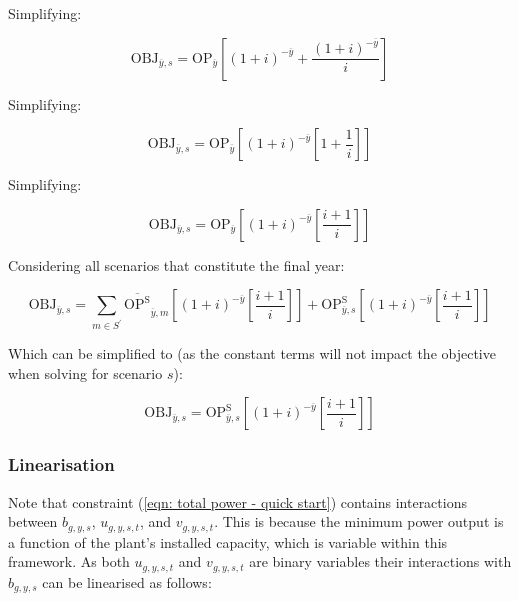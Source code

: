 \documentclass{article}
\newcommand{\sScenarios}{S}
\newcommand{\iGenerator}{g}
\newcommand{\iYear}{y}
\newcommand{\iYearTerminal}{\overline{\iYear}}
\newcommand{\iScenario}{s}
\newcommand{\iScenarioAlias}{m}
\newcommand{\iInterval}{t}
\newcommand{\cOperatingCost}[1][\iYear,\iScenario]{\mathrm{OP}_{#1}}
\newcommand{\cInterestRate}{i}
\newcommand{\cObjectiveFunction}{\mathrm{OBJ}}
\newcommand{\cOperatingCostScenario}[1][\iYear,\iScenario]{\mathrm{OP}^{\mathrm{\sScenarios}}_{#1}}
\newcommand{\vStartupIndicator}[1][\iGenerator,\iYear,\iScenario,\iInterval]{v_{#1}}
\newcommand{\vOnIndicator}[1][\iGenerator,\iYear,\iScenario,\iInterval]{u_{#1}}
\newcommand{\vInstalledCapacityTotalScenario}[1][\iGenerator,\iYear,\iScenario]{b_{#1}}
\begin{document}
Simplifying:

\begin{equation}
	\cObjectiveFunction_{\iYearTerminal,\iScenario} = \cOperatingCost[\iYearTerminal]\left[(1+\cInterestRate)^{-\iYearTerminal}  + \frac{(1+\cInterestRate)^{-\iYearTerminal}}{\cInterestRate}\right]
\end{equation}

Simplifying:

\begin{equation}
	\cObjectiveFunction_{\iYearTerminal,\iScenario} = \cOperatingCost[\iYearTerminal] \left[(1+\cInterestRate)^{-\iYearTerminal} \left[1 + \frac{1}{\cInterestRate}\right]\right]
\end{equation}

Simplifying:

\begin{equation}
	\cObjectiveFunction_{\iYearTerminal,\iScenario} = \cOperatingCost[\iYearTerminal] \left[(1+\cInterestRate)^{-\iYearTerminal} \left[ \frac{\cInterestRate + 1}{\cInterestRate}\right]\right]
\end{equation}

Considering all scenarios that constitute the final year:

\begin{equation}
	\cObjectiveFunction_{\iYearTerminal,\iScenario} = \sum\limits_{\iScenarioAlias \in \sScenarios^{\prime}} \overline{\cOperatingCostScenario[]}_{\iYearTerminal,\iScenarioAlias} \left[(1+\cInterestRate)^{-\iYearTerminal} \left[\frac{\cInterestRate + 1}{\cInterestRate}\right]\right] + \cOperatingCostScenario[\iYearTerminal,\iScenario] \left[(1+\cInterestRate)^{-\iYearTerminal} \left[\frac{\cInterestRate + 1}{\cInterestRate}\right]\right] 
\end{equation}

Which can be simplified to (as the constant terms will not impact the objective when solving for scenario $\iScenario$):

\begin{equation}
\cObjectiveFunction_{\iYearTerminal,\iScenario} = \cOperatingCostScenario[\iYearTerminal,\iScenario] \left[(1+\cInterestRate)^{-\iYearTerminal} \left[\frac{\cInterestRate + 1}{\cInterestRate}\right]\right] 
\end{equation}

\subsubsection{Linearisation}
Note that constraint (\ref{eqn: total power - quick start}) contains interactions between $\vInstalledCapacityTotalScenario$, $\vOnIndicator$, and $\vStartupIndicator$. This is because the minimum power output is a function of the plant's installed capacity, which is variable within this framework. As both $\vOnIndicator$ and $\vStartupIndicator$ are binary variables their interactions with $\vInstalledCapacityTotalScenario$ can be linearised as follows:
\end{document}
